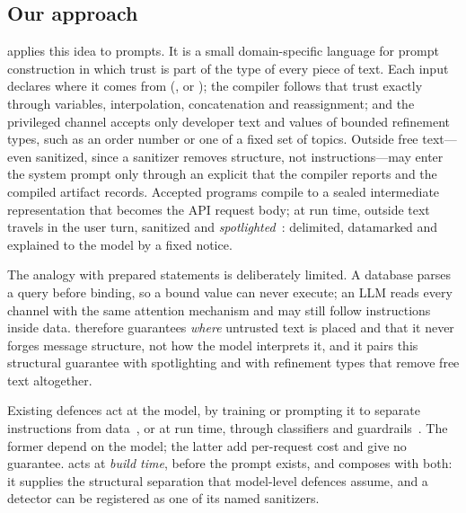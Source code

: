 \documentclass[journal]{IEEEtran}
\begin{document}
\subsection{Our approach}
\TL{} applies this idea to prompts. It is a small domain-specific language for prompt construction in which trust is part of the type of every piece of text. Each input declares where it comes from (,  or ); the compiler follows that trust exactly through variables, interpolation, concatenation and reassignment; and the privileged  channel accepts only developer text and values of bounded refinement types, such as an order number or one of a fixed set of topics. Outside free text---even sanitized, since a sanitizer removes structure, not instructions---may enter the system prompt only through an explicit  that the compiler reports and the compiled artifact records. Accepted programs compile to a sealed intermediate representation that becomes the API request body; at run time, outside text travels in the user turn, sanitized and \emph{spotlighted}~\cite{hines2024spotlighting}: delimited, datamarked and explained to the model by a fixed notice.

The analogy with prepared statements is deliberately limited. A database parses a query before binding, so a bound value can never execute; an LLM reads every channel with the same attention mechanism and may still follow instructions inside data. \TL{} therefore guarantees \emph{where} untrusted text is placed and that it never forges message structure, not how the model interprets it, and it pairs this structural guarantee with spotlighting and with refinement types that remove free text altogether.

Existing defences act at the model, by training or prompting it to separate instructions from data~\cite{wallace2024hierarchy,chen2025struq,hines2024spotlighting}, or at run time, through classifiers and guardrails~\cite{jacob2024promptshield,rebedea2023nemo}. The former depend on the model; the latter add per-request cost and give no guarantee. \TL{} acts at \emph{build time}, before the prompt exists, and composes with both: it supplies the structural separation that model-level defences assume, and a detector can be registered as one of its named sanitizers.
\end{document}
